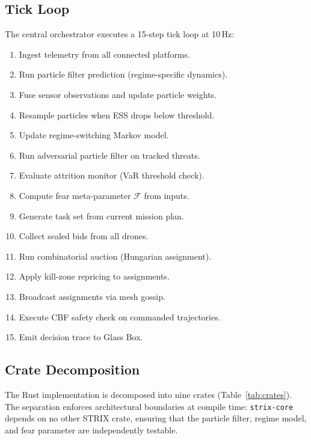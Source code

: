 \documentclass[conference]{IEEEtran}
\newcommand{\fear}{\mathcal{F}}
\begin{document}
\subsection{Tick Loop}

The central orchestrator executes a 15-step tick loop at 10\,Hz:
\begin{enumerate}
\setlength{\itemsep}{0pt}
  \item Ingest telemetry from all connected platforms.
  \item Run particle filter prediction (regime-specific dynamics).
  \item Fuse sensor observations and update particle weights.
  \item Resample particles when ESS drops below threshold.
  \item Update regime-switching Markov model.
  \item Run adversarial particle filter on tracked threats.
  \item Evaluate attrition monitor (VaR threshold check).
  \item Compute fear meta-parameter $\fear$ from inputs.
  \item Generate task set from current mission plan.
  \item Collect sealed bids from all drones.
  \item Run combinatorial auction (Hungarian assignment).
  \item Apply kill-zone repricing to assignments.
  \item Broadcast assignments via mesh gossip.
  \item Execute CBF safety check on commanded trajectories.
  \item Emit decision trace to Glass Box.
\end{enumerate}

\subsection{Crate Decomposition}

The Rust implementation is decomposed into nine crates
(Table~\ref{tab:crates}).  The separation enforces architectural
boundaries at compile time: \texttt{strix-core} depends on no other
STRIX crate, ensuring that the particle filter, regime model, and
fear parameter are independently testable.
\end{document}

